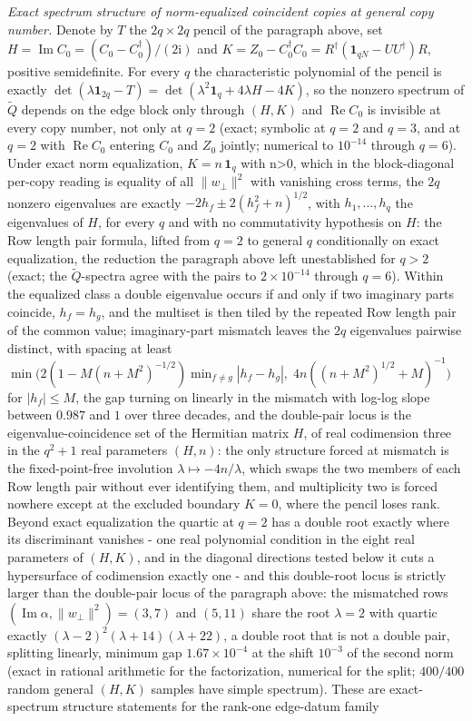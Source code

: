 \emph{Exact spectrum structure of norm-equalized coincident copies at general copy number.} Denote by \(T\) the \(2q\times2q\) pencil of the paragraph above, set \(H=\operatorname{Im}C_0=(C_0-C_0^\dagger)/(2\mathrm i)\) and \(K=Z_0-C_0^\dagger C_0=R^\dagger(\mathbf 1_{qN}-UU^\dagger)R\), positive semidefinite. For every \(q\) the characteristic polynomial of the pencil is exactly \(\det(\lambda\mathbf 1_{2q}-T)=\det(\lambda^{2}\mathbf 1_q+4\lambda H-4K)\), so the nonzero spectrum of \(\widetilde Q\) depends on the edge block only through \((H,K)\) and \(\operatorname{Re}C_0\) is invisible at every copy number, not only at \(q=2\) (exact; symbolic at \(q=2\) and \(q=3\), and at \(q=2\) with \(\operatorname{Re}C_0\) entering \(C_0\) and \(Z_0\) jointly; numerical to \(10^{-14}\) through \(q=6\)). Under exact norm equalization, \(K=n\,\mathbf 1_q\) with n>0, which in the block-diagonal per-copy reading is equality of all \(\|w_\perp\|^{2}\) with vanishing cross terms, the \(2q\) nonzero eigenvalues are exactly \(-2h_f\pm2(h_f^{2}+n)^{1/2}\), with \(h_{1},\dots,h_{q}\) the eigenvalues of \(H\), for every \(q\) and with no commutativity hypothesis on \(H\): the Row length pair formula, lifted from \(q=2\) to general \(q\) conditionally on exact equalization, the reduction the paragraph above left unestablished for \(q>2\) (exact; the \(\widetilde Q\)-spectra agree with the pairs to \(2\times10^{-14}\) through \(q=6\)). Within the equalized class a double eigenvalue occurs if and only if two imaginary parts coincide, \(h_f=h_g\), and the multiset is then tiled by the repeated Row length pair of the common value; imaginary-part mismatch leaves the \(2q\) eigenvalues pairwise distinct, with spacing at least \(\min\bigl(2(1-M(n+M^{2})^{-1/2})\min_{f\ne g}|h_f-h_g|,\;4n((n+M^{2})^{1/2}+M)^{-1}\bigr)\) for \(|h_f|\le M\), the gap turning on linearly in the mismatch with log-log slope between \(0.987\) and \(1\) over three decades, and the double-pair locus is the eigenvalue-coincidence set of the Hermitian matrix \(H\), of real codimension three in the \(q^{2}+1\) real parameters \((H,n)\): the only structure forced at mismatch is the fixed-point-free involution \(\lambda\mapsto-4n/\lambda\), which swaps the two members of each Row length pair without ever identifying them, and multiplicity two is forced nowhere except at the excluded boundary \(K=0\), where the pencil loses rank. Beyond exact equalization the quartic at \(q=2\) has a double root exactly where its discriminant vanishes - one real polynomial condition in the eight real parameters of \((H,K)\), and in the diagonal directions tested below it cuts a hypersurface of codimension exactly one - and this double-root locus is strictly larger than the double-pair locus of the paragraph above: the mismatched rows \((\operatorname{Im}\alpha,\|w_\perp\|^{2})=(3,7)\) and \((5,11)\) share the root \(\lambda=2\) with quartic exactly \((\lambda-2)^{2}(\lambda+14)(\lambda+22)\), a double root that is not a double pair, splitting linearly, minimum gap \(1.67\times10^{-4}\) at the shift \(10^{-3}\) of the second norm (exact in rational arithmetic for the factorization, numerical for the split; \(400/400\) random general \((H,K)\) samples have simple spectrum). These are exact-spectrum structure statements for the rank-one edge-datum family 